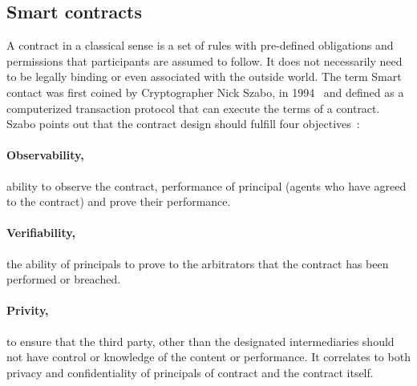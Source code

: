 \subsection{Smart contracts}
A contract in a classical sense is a set of rules with pre-defined obligations
and permissions that participants are assumed to follow. It does not
necessarily need to be legally binding or even associated with the outside
world. The term Smart contact was first coined by Cryptographer Nick Szabo, in
1994~\cite{SzaboSmart1994} and defined as a computerized transaction protocol
that can execute the terms of a contract. Szabo points out that the contract
design should fulfill four objectives~\cite{szabo1996smart}: 
\paragraph{Observability,}ability to observe the contract, performance of
principal (agents who have agreed to the contract) and prove their
performance.
\paragraph{Verifiability,}the ability of principals to prove to the arbitrators
that the contract has been performed or breached.  
\paragraph{Privity,}to ensure that the third party, other than the designated
intermediaries should not have control or knowledge of the content or
performance. It correlates to both privacy and confidentiality of principals of
contract and the contract itself. 
